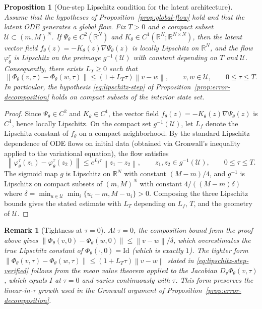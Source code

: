 \documentclass[11pt]{article}
\newtheorem{remark}{Remark}
\newtheorem{proposition}{Proposition}
\newcommand{\R}{\mathbb{R}}
\newcommand{\cU}{\mathcal{U}}
\newcommand{\PhiT}{\Phi_{\theta}}
\newcommand{\norm}[1]{\left\lVert #1 \right\rVert}
\begin{document}
\begin{proposition}[One-step Lipschitz condition for the latent architecture]\label{prop:lipschitz}
Assume that the hypotheses of Proposition~\ref{prop:global-flow} hold and that the latent ODE generates a global flow. Fix $T>0$ and a compact subset $\cU\subset (m,M)^N$. If $\Psi_{\theta}\in C^2(\R^N)$ and $K_{\theta}\in C^1(\R^N;\R^{N\times N})$, then the latent vector field $f_{\theta}(z)=-K_{\theta}(z)\nabla \Psi_{\theta}(z)$ is locally Lipschitz on $\R^N$, and the flow $\varphi_{\theta}^{\tau}$ is Lipschitz on the preimage $g^{-1}(\cU)$ with constant depending on $T$ and $\cU$. Consequently, there exists $L_T\ge 0$ such that
\begin{equation}\label{eq:lipschitz-step-verified}
\norm{\PhiT(v,\tau)-\PhiT(w,\tau)} \le (1+L_T\tau)\norm{v-w}, \qquad v,w\in \cU, \qquad 0\le \tau\le T.
\end{equation}
In particular, the hypothesis \eqref{eq:lipschitz-step} of Proposition~\ref{prop:error-decomposition} holds on compact subsets of the interior state set.
\end{proposition}

\begin{proof}
Since $\Psi_{\theta}\in C^2$ and $K_{\theta}\in C^1$, the vector field $f_{\theta}(z)=-K_{\theta}(z)\nabla \Psi_{\theta}(z)$ is $C^1$, hence locally Lipschitz. On the compact set $g^{-1}(\cU)$, let $L_f$ denote the Lipschitz constant of $f_{\theta}$ on a compact neighborhood. By the standard Lipschitz dependence of ODE flows on initial data (obtained via Gronwall's inequality applied to the variational equation), the flow satisfies
\begin{equation*}
\norm{\varphi_{\theta}^{\tau}(z_1)-\varphi_{\theta}^{\tau}(z_2)}\le e^{L_f\tau}\norm{z_1-z_2}, \qquad z_1,z_2\in g^{-1}(\cU), \qquad 0\le \tau\le T.
\end{equation*}
The sigmoid map $g$ is Lipschitz on $\R^N$ with constant $(M-m)/4$, and $g^{-1}$ is Lipschitz on compact subsets of $(m,M)^N$ with constant $4/((M-m)\delta)$ where $\delta=\min_{u\in \cU}\min_i\{u_i-m,M-u_i\}>0$. Composing the three Lipschitz bounds gives the stated estimate with $L_T$ depending on $L_f$, $T$, and the geometry of $\cU$.
\end{proof}

\begin{remark}[Tightness at $\tau=0$]\label{rem:tightness-tau0}
At $\tau=0$, the composition bound from the proof above gives $\norm{\PhiT(v,0)-\PhiT(w,0)}\le \norm{v-w}/\delta$, which overestimates the true Lipschitz constant of $\PhiT(\cdot,0)=\mathrm{Id}$ (which is exactly $1$). The tighter form $\norm{\PhiT(v,\tau)-\PhiT(w,\tau)}\le (1+L_T\tau)\norm{v-w}$ stated in \eqref{eq:lipschitz-step-verified} follows from the mean value theorem applied to the Jacobian $D_v\PhiT(v,\tau)$, which equals $I$ at $\tau=0$ and varies continuously with $\tau$. This form preserves the linear-in-$\tau$ growth used in the Gronwall argument of Proposition~\ref{prop:error-decomposition}.
\end{remark}
\end{document}
